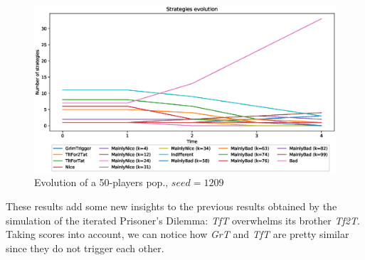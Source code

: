 \documentclass[journal,10pt,twoside]{IEEEtran}
\begin{document}
\begin{figure}[!ht]
    \centering
    \includegraphics[width=.9\columnwidth]{../img/ripdmp-const/seed1209/ripdmp-evolution-const-pop-50}
    \caption{Evolution of a 50-players pop., $seed = 1209$}
    \label{fig:constRseed1209}
\end{figure}

These results add some new insights to the previous results obtained by the simulation of the iterated Prisoner's Dilemma: \textit{TfT} overwhelms its brother \textit{Tf2T}. Taking scores into account, we can notice how \textit{GrT} and \textit{TfT} are pretty similar since they do not trigger each other.
\end{document}
